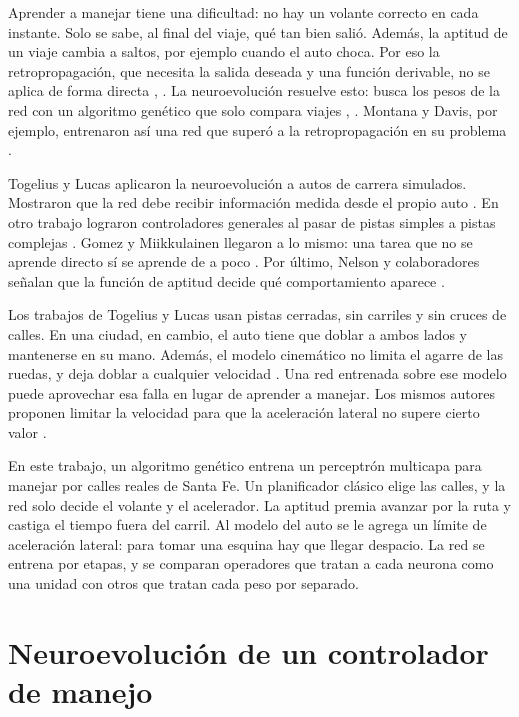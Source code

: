 \documentclass[final]{article}
\begin{document}
Aprender a manejar tiene una dificultad: no hay un volante correcto en cada instante.
Solo se sabe, al final del viaje, qué tan bien salió.
Además, la aptitud de un viaje cambia a saltos, por ejemplo cuando el auto choca.
Por eso la retropropagación, que necesita la salida deseada y una función derivable, no se aplica de forma directa \cite[p.~763]{montana1989}, \cite[p.~1425]{yao1999}.
La neuroevolución resuelve esto: busca los pesos de la red con un algoritmo genético que solo compara viajes \cite[p.~762]{montana1989}, \cite[p.~1439]{yao1999}.
Montana y Davis, por ejemplo, entrenaron así una red que superó a la retropropagación en su problema \cite[p.~762]{montana1989}.

Togelius y Lucas aplicaron la neuroevolución a autos de carrera simulados.
Mostraron que la red debe recibir información medida desde el propio auto \cite[pp.~1906 y 1912]{togelius2005}.
En otro trabajo lograron controladores generales al pasar de pistas simples a pistas complejas \cite[p.~1194]{togelius2006}.
Gomez y Miikkulainen llegaron a lo mismo: una tarea que no se aprende directo sí se aprende de a poco \cite[p.~11]{gomez1996}.
Por último, Nelson y colaboradores señalan que la función de aptitud decide qué comportamiento aparece \cite[p.~365]{nelson2009}.

Los trabajos de Togelius y Lucas usan pistas cerradas, sin carriles y sin cruces de calles.
En una ciudad, en cambio, el auto tiene que doblar a ambos lados y mantenerse en su mano.
Además, el modelo cinemático no limita el agarre de las ruedas, y deja doblar a cualquier velocidad \cite[p.~1098]{kong2015}.
Una red entrenada sobre ese modelo puede aprovechar esa falla en lugar de aprender a manejar.
Los mismos autores proponen limitar la velocidad para que la aceleración lateral no supere cierto valor \cite[p.~1099]{kong2015}.

En este trabajo, un algoritmo genético entrena un perceptrón multicapa para manejar por calles reales de Santa Fe.
Un planificador clásico elige las calles, y la red solo decide el volante y el acelerador.
La aptitud premia avanzar por la ruta y castiga el tiempo fuera del carril.
Al modelo del auto se le agrega un límite de aceleración lateral: para tomar una esquina hay que llegar despacio.
La red se entrena por etapas, y se comparan operadores que tratan a cada neurona como una unidad con otros que tratan cada peso por separado.

\section{Neuroevolución de un controlador de manejo}
\label{sec:metodos}
\end{document}
